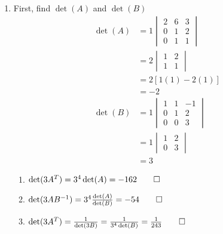 \documentclass[12pt, a4paper]{article}
\begin{document}
\begin{enumerate}[Q\arabic*.]
  \item First, find $\det(A)$ and $\det(B)$
    \begin{align*}
      \det(A) &= 1\begin{vmatrix}2&6&3\\0&1&2\\0&1&1\end{vmatrix}\\
              &= 2\begin{vmatrix}1&2\\1&1\end{vmatrix}\\
              &= 2[1(1)-2(1)]\\
              &= -2 \\
      \det(B) &= 1\begin{vmatrix}1&1&-1\\0&1&2\\0&0&3\end{vmatrix}\\
              &= 1\begin{vmatrix}1&2\\0&3\end{vmatrix}\\
              &= 3
    \end{align*}
    \begin{enumerate}[(\alph*)]
      \item $\det(3A^T) = 3^4\det(A) = -162 \qed$
      \item $\det(3AB^{-1}) = 3^4\frac{\det(A)}{\det(B)} = -54 \qed$
      \item $\det(3A^T) = \frac{1}{\det(3B)} = \frac{1}{3^4\det(B)} =  \frac{1}{243}\qed$
    \end{enumerate}


\end{enumerate}
\end{document}
